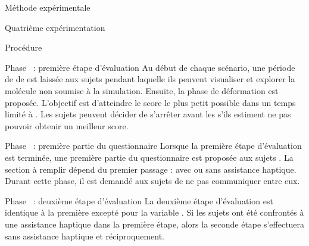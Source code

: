 \documentclass[myfrancais,ngerman,english,frenchb]{mythesis}
\begin{document}
\begin{mychapter}{Méthode expérimentale}
\begin{mysection}{Quatrième expérimentation}
\begin{mysubsection}{Procédure}
\begin{myparagraph}{Phase~ : première étape d'évaluation}
					Au début de chaque scénario, une période de  de \mybrainstorming est laissée aux sujets pendant laquelle ils peuvent visualiser et explorer la molécule non soumise à la simulation.
					Ensuite, la phase de déformation est proposée.
					L'objectif est d'atteindre le score  le plus petit possible dans un temps limité à .
					Les sujets peuvent décider de s'arrêter avant les  s'ils estiment ne pas pouvoir obtenir un meilleur score.
				\end{myparagraph}
				\begin{myparagraph}{Phase~ : première partie du questionnaire}
					Lorsque la première étape d'évaluation est terminée, une première partie du questionnaire est proposée aux sujets .
					La section à remplir dépend du premier passage : avec ou sans assistance haptique.
					Durant cette phase, il est demandé aux sujets de ne pas communiquer entre eux.
				\end{myparagraph}
				\begin{myparagraph}{Phase~ : deuxième étape d'évaluation}
					La deuxième étape d'évaluation est identique à la première excepté pour la variable .
					Si les sujets ont été confrontés à une assistance haptique dans la première étape, alors la seconde étape s'effectuera sans assistance haptique et réciproquement.


\end{myparagraph}
\end{mysubsection}
\end{mysection}
\end{mychapter}
\end{document}
